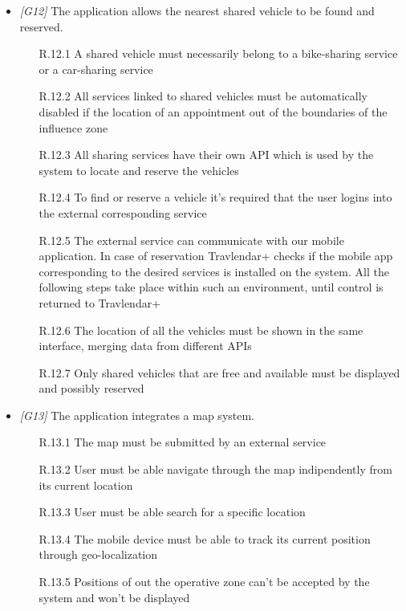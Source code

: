 \begin{itemize}
\item \textit{[G12]} The application allows the nearest shared vehicle to be found and reserved.

                   \begin{itemize}
                        \item [R.12.1] A shared vehicle must necessarily belong to a bike-sharing service or a car-sharing service
                        \item [R.12.2] All services linked to shared vehicles must be automatically disabled if the location of an appointment out of the boundaries of the influence zone
                        \item [R.12.3] All sharing services have their own API which is used by the system to locate and reserve the vehicles
                        \item [R.12.4] To find or reserve a vehicle it's required that the user logins into the external corresponding service
                        \item [R.12.5] The external service can communicate with our mobile application. In case of reservation Travlendar+ checks if the mobile app corresponding to the desired services is installed on the system. All the following steps take place within such an environment, until control is returned to Travlendar+
                        \item [R.12.6] The location of all the vehicles must be shown in the same interface, merging data from different APIs
			\item[R.12.7] Only shared vehicles that are free and available must be displayed and possibly reserved
                        \end{itemize}

\item \textit{[G13]} The application integrates a map system.
                   
                  \begin{itemize}
                        \item [R.13.1] The map must be submitted by an external service 
                        \item [R.13.2] User must be able navigate through the map indipendently from its current location
                        \item [R.13.3] User must be able search for a specific location
                        \item [R.13.4] The mobile device must be able to track its current position through geo-localization
                        \item [R.13.5] Positions of out the operative zone can't be accepted by the system and won't be displayed
                   \end{itemize}


\end{itemize}
